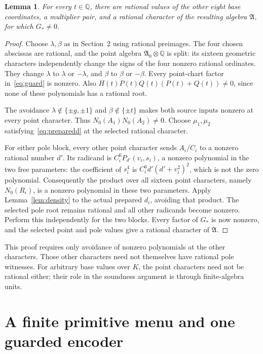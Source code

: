 \documentclass[11pt,a4paper]{article}
\newtheorem{lemma}[theorem]{Lemma}
\newcommand{\Q}{\mathbb Q}\newcommand{\Z}{\mathbb Z}
\begin{document}
\begin{lemma}\label{lem:guards}
For every \(t\in\Q\), there are rational values of the other eight
base coordinates, a multiplier pair, and a rational character of
the resulting algebra \(\mathfrak A\), for which \(G_*\ne0\).
\end{lemma}
\begin{proof}
Choose \(\lambda,\beta\) as in Section~2 using rational preimages.
The four chosen abscissas are rational, and the point algebra
\(\mathfrak A_0\otimes\Q\) is split: its sixteen geometric characters
independently change the signs of the four nonzero rational ordinates.
They change \(\lambda\) to \(\lambda\) or \(-\lambda\), and \(\beta\)
to \(\beta\) or \(-\beta\). Every point-chart factor in~\eqref{eq:guard}
is nonzero. Also \(H(t)P(t)Q(t)(P(t)+Q(t))\ne0\), since none of these
polynomials has a rational root.

The avoidance \(\lambda\notin\{\pm g,\pm1\}\) and
\(\beta\notin\{\pm t\}\) makes both source inputs nonzero at every
point character. Thus \(N_0(A_1)N_0(A_2)\ne0\). Choose
\(\mu_1,\mu_2\) satisfying~\eqref{eq:preparedd} at the selected
rational character.

For either pole block, every other point character sends \(A_i/C_i\)
to a nonzero rational number \(d'\). Its radicand is
\(C_i^6P_{d'}(v_i,s_i)\), a nonzero polynomial in the two free
parameters: the coefficient of \(s_i^4\) is
\(C_i^6d'(d'+v_i^2)^2\), which is not the zero polynomial.
Consequently the product over all sixteen point characters, namely
\(N_0(R_i)\), is a nonzero polynomial in these two parameters.
Apply Lemma~\ref{lem:density} to the actual prepared \(d_i\), avoiding
that product. The selected pole root remains rational and all other
radicands become nonzero. Perform this independently for the two
blocks. Every factor of \(G_*\) is now nonzero, and the selected
point and pole values give a rational character of \(\mathfrak A\).
\end{proof}

This proof requires only avoidance of nonzero polynomials at the other
characters. Those other characters need not themselves have rational
pole witnesses. For arbitrary base values over \(K\), the point
characters need not be rational either; their role in the soundness
argument is through finite-algebra units.

\section{A finite primitive menu and one guarded encoder}
\end{document}
